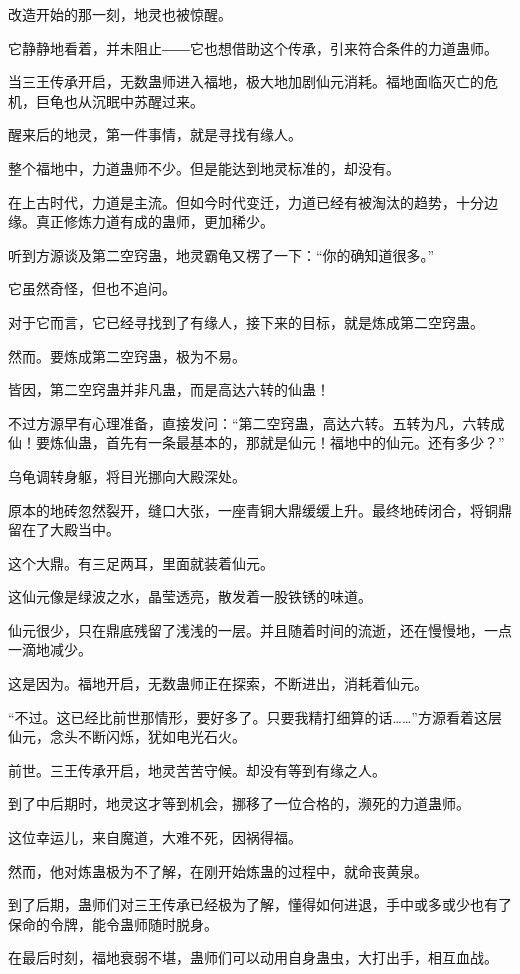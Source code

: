 \begin{this_body}
改造开始的那一刻，地灵也被惊醒。

它静静地看着，并未阻止――它也想借助这个传承，引来符合条件的力道蛊师。

当三王传承开启，无数蛊师进入福地，极大地加剧仙元消耗。福地面临灭亡的危机，巨龟也从沉眠中苏醒过来。

醒来后的地灵，第一件事情，就是寻找有缘人。

整个福地中，力道蛊师不少。但是能达到地灵标准的，却没有。

在上古时代，力道是主流。但如今时代变迁，力道已经有被淘汰的趋势，十分边缘。真正修炼力道有成的蛊师，更加稀少。

听到方源谈及第二空窍蛊，地灵霸龟又楞了一下：“你的确知道很多。”

它虽然奇怪，但也不追问。

对于它而言，它已经寻找到了有缘人，接下来的目标，就是炼成第二空窍蛊。

然而。要炼成第二空窍蛊，极为不易。

皆因，第二空窍蛊并非凡蛊，而是高达六转的仙蛊！

不过方源早有心理准备，直接发问：“第二空窍蛊，高达六转。五转为凡，六转成仙！要炼仙蛊，首先有一条最基本的，那就是仙元！福地中的仙元。还有多少？”

乌龟调转身躯，将目光挪向大殿深处。

原本的地砖忽然裂开，缝口大张，一座青铜大鼎缓缓上升。最终地砖闭合，将铜鼎留在了大殿当中。

这个大鼎。有三足两耳，里面就装着仙元。

这仙元像是绿波之水，晶莹透亮，散发着一股铁锈的味道。

仙元很少，只在鼎底残留了浅浅的一层。并且随着时间的流逝，还在慢慢地，一点一滴地减少。

这是因为。福地开启，无数蛊师正在探索，不断进出，消耗着仙元。

“不过。这已经比前世那情形，要好多了。只要我精打细算的话……”方源看着这层仙元，念头不断闪烁，犹如电光石火。

前世。三王传承开启，地灵苦苦守候。却没有等到有缘之人。

到了中后期时，地灵这才等到机会，挪移了一位合格的，濒死的力道蛊师。

这位幸运儿，来自魔道，大难不死，因祸得福。

然而，他对炼蛊极为不了解，在刚开始炼蛊的过程中，就命丧黄泉。

到了后期，蛊师们对三王传承已经极为了解，懂得如何进退，手中或多或少也有了保命的令牌，能令蛊师随时脱身。

在最后时刻，福地衰弱不堪，蛊师们可以动用自身蛊虫，大打出手，相互血战。


\end{this_body}
